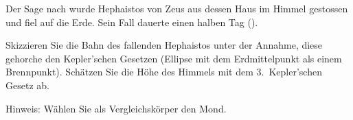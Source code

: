 Der Sage nach wurde Hephaistos von Zeus aus dessen Haus im Himmel gestossen und fiel auf die Erde. Sein Fall dauerte einen halben Tag (\tFO).
\begin{abcliste}
\abc Skizzieren Sie die Bahn des fallenden Hephaistos unter der Annahme, diese gehorche den Kepler'schen Gesetzen (Ellipse mit dem Erdmittelpunkt als einem Brennpunkt).
\abc Schätzen Sie die Höhe des Himmels mit dem 3.~Kepler'schen Gesetz ab.
\end{abcliste}
Hinweis: Wählen Sie als Vergleichskörper den Mond.
